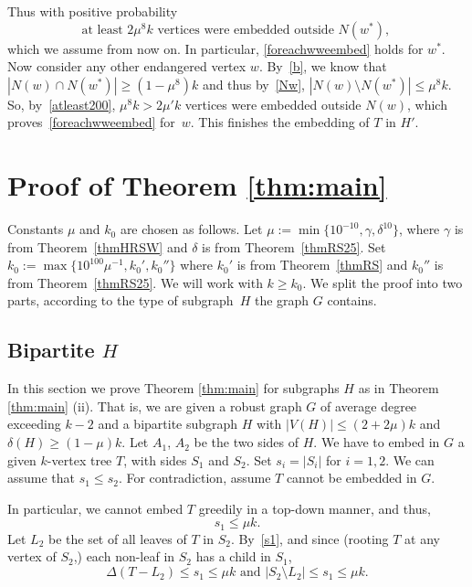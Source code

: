 \documentclass[12pt]{article}
\begin{document}
Thus with positive probability 
\begin{equation}\label{atleast200}
\text{at least $2\mu^8 k $ vertices were embedded outside $N({w^*})$, }
\end{equation}
which we  assume from now on. In particular, \eqref{foreachwweembed} holds for $w^*$. Now consider any other endangered vertex $w$. By~\eqref{b}, we know that $|N(w) \cap N(w^*)| \ge (1-\mu^8)k$ and thus by~\eqref{Nw}, $|N(w) \setminus N(w^*)|\le \mu^8k$. So, by~\eqref{atleast200}, $\mu^8 k > 2\mu' k $ vertices were embedded outside $N({w})$, which proves~\eqref{foreachwweembed} for~$w$. This finishes the embedding of $T$ in $H'$.
 


\section{Proof of Theorem \ref{thm:main}}
\label{mainproof6}
Constants $\mu$ and $k_0$ are chosen as follows. Let $\mu:= \min\{10^{-10}, \gamma, \delta^{10}\}$, where $\gamma$ is from Theorem~\ref{thmHRSW} and $\delta$ is from Theorem~\ref{thmRS25}. Set $k_0:=\max\{10^{100}\mu^{-1}
,k_0', k_0''\}$ where $k_0'$ is from Theorem~\ref{thmRS} and $k_0''$ is from Theorem~\ref{thmRS25}. We will work with $k\ge k_0$.
We split the proof into two parts, according to the type of subgraph~$H$ the graph $G$ contains. 




\subsection{Bipartite $H$}\label{sec:balbip}
In this section we prove Theorem \ref{thm:main} for subgraphs $H$ as in Theorem \ref{thm:main} (ii). That is, we are given a robust graph $G$ of average degree exceeding $k-2$ and a bipartite subgraph $H$ with $|V(H)|
    \le (2+2\mu)k$ and $\delta(H)\ge (1-\mu)k$.  Let $A_1$, $A_2$ be the two sides of $H$.
  We have to embed in $G$ a given $k$-vertex tree $T$, with sides $S_1$ and $S_2$. Set $s_i=|S_i|$ for $i=1,2$. We can assume that $s_1\le s_2$.  For contradiction,  assume $T$ cannot be embedded in $G$.
    
In particular, we cannot embed  $T$ greedily in a top-down manner, and thus,  
\begin{equation}\label{s1}
s_1 \le \mu k.
\end{equation}
Let $L_2$ be the set of all leaves of $T$ in $S_2$.   By~\eqref{s1}, and since (rooting $T$ at any vertex of $S_2$,) each non-leaf in $S_2$ has a child in $S_1$,
\begin{equation}\label{T'andL2}
\text{$\Delta(T-L_2)\le s_1\le \mu k$  and $|S_2\setminus L_2|\le s_1\le \mu k$}. 
\end{equation}
 
\end{document}

